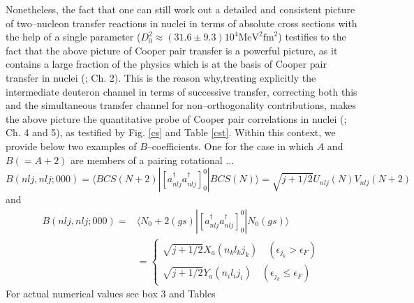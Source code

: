 \documentclass[a4paper,11pt]{book}
\numberwithin{equation}{section}
\numberwithin{figure}{section}
\numberwithin{table}{section}
\begin{document}
Nonetheless, the fact that one can still work out a detailed and consistent picture of two--nucleon transfer reactions in nuclei in terms of absolute cross sections with the help of a single parameter ($D_0^2\approx(31.6\pm 9.3)10^4 \text{MeV}^2\text{fm}^2$) testifies to the fact that the above picture of Cooper pair transfer is a powerful picture, as it contains a large fraction of the physics which is at the basis of Cooper pair transfer in nuclei (\cite{Broglia:73}; Ch. 2). This is the reason why,treating explicitly the intermediate deuteron channel in terms of successive transfer, correcting both this and the simultaneous transfer channel for non--orthogonality contributions, makes the above picture the quantitative probe of Cooper pair correlations in nuclei (\cite{Potel:13}; Ch. 4 and 5), as testified by Fig. \ref{cs} and Table \ref{cst}. Within this context, we provide below two examples of $B$--coefficients. One for the case in which $A$ and $B(=A+2)$ are members of a pairing rotational ... 
\begin{equation*}
B(nlj,nlj;000)=\langle BCS(N+2)|[a^\dagger_{nlj}a^\dagger_{nlj}]^0_0|BCS(N)\rangle=\sqrt{j+1/2}U_{nlj}(N)V_{nlj}(N+2)
\end{equation*}
and
\begin{equation*}
\begin{split}
B(nlj,nlj;000)=&\langle N_0+2(gs)|[a^\dagger_{nlj}a^\dagger_{nlj}]^0_0|N_0(gs)\rangle \\
&=\left\{\begin{array}{c}
 \sqrt{j+1/2}X_a(n_kl_kj_k)\quad (\epsilon_{j_k}>\epsilon_F) \\ 
\sqrt{j+1/2}Y_a(n_il_ij_i)\quad (\epsilon_{j_k}\leq\epsilon_F)
\end{array} \right.
\end{split}
\end{equation*}
For actual numerical values see box 3 and Tables
\end{document}
